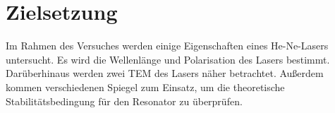 \section{Zielsetzung}
\label{sec:Zielsetzung}

Im Rahmen des Versuches werden einige Eigenschaften eines He-Ne-Lasers untersucht. Es wird die Wellenlänge und Polarisation des Lasers bestimmt. Darüberhinaus werden zwei TEM des Lasers näher betrachtet. Außerdem kommen verschiedenen Spiegel zum Einsatz, um die theoretische Stabilitätsbedingung für den Resonator zu überprüfen. 

